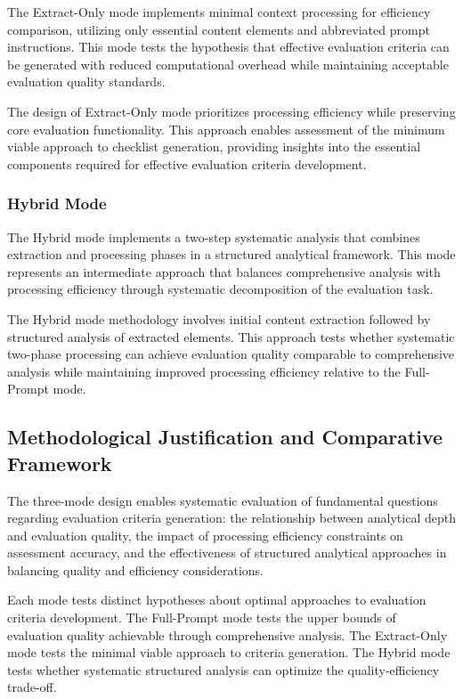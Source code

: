 The Extract-Only mode implements minimal context processing for efficiency comparison, utilizing only essential content elements and abbreviated prompt instructions. This mode tests the hypothesis that effective evaluation criteria can be generated with reduced computational overhead while maintaining acceptable evaluation quality standards.

The design of Extract-Only mode prioritizes processing efficiency while preserving core evaluation functionality. This approach enables assessment of the minimum viable approach to checklist generation, providing insights into the essential components required for effective evaluation criteria development.

\subsubsection{Hybrid Mode}

The Hybrid mode implements a two-step systematic analysis that combines extraction and processing phases in a structured analytical framework. This mode represents an intermediate approach that balances comprehensive analysis with processing efficiency through systematic decomposition of the evaluation task.

The Hybrid mode methodology involves initial content extraction followed by structured analysis of extracted elements. This approach tests whether systematic two-phase processing can achieve evaluation quality comparable to comprehensive analysis while maintaining improved processing efficiency relative to the Full-Prompt mode.

\subsection{Methodological Justification and Comparative Framework}

The three-mode design enables systematic evaluation of fundamental questions regarding evaluation criteria generation: the relationship between analytical depth and evaluation quality, the impact of processing efficiency constraints on assessment accuracy, and the effectiveness of structured analytical approaches in balancing quality and efficiency considerations.

Each mode tests distinct hypotheses about optimal approaches to evaluation criteria development. The Full-Prompt mode tests the upper bounds of evaluation quality achievable through comprehensive analysis. The Extract-Only mode tests the minimal viable approach to criteria generation. The Hybrid mode tests whether systematic structured analysis can optimize the quality-efficiency trade-off.

